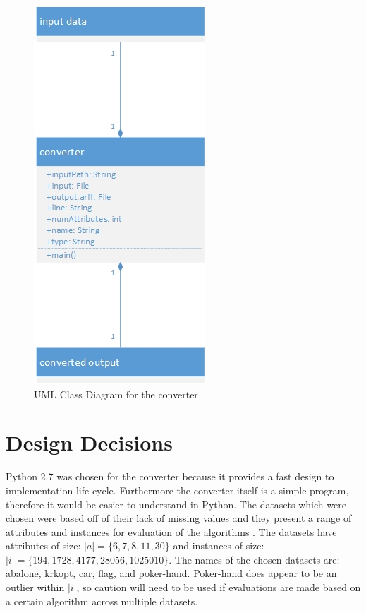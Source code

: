 \documentclass[twoside,11pt]{article}
\begin{document}
\begin{figure}[h]
\centering
\includegraphics[scale=0.8]{UML.jpg}
\caption{UML Class Diagram for the converter}
\label{uml}
\end{figure}

\section{Design Decisions}
Python 2.7 was chosen for the converter because it provides a fast design to implementation life cycle. Furthermore the converter itself is a simple program, therefore it would be easier to understand in Python. The datasets which were chosen were based off of their lack of missing values and they present a range of attributes and instances for evaluation of the algorithms \citep{uci}. The datasets have attributes of size: $|a|=\{6,7,8,11,30\}$ and instances of size: $|i|=\{194,1728,4177,28056,1025010\}$. The names of the chosen datasets are: abalone, krkopt, car, flag, and poker-hand. Poker-hand does appear to be an outlier within $|i|$, so caution will need to be used if evaluations are made based on a certain algorithm across multiple datasets.

\pagebreak
\end{document}
